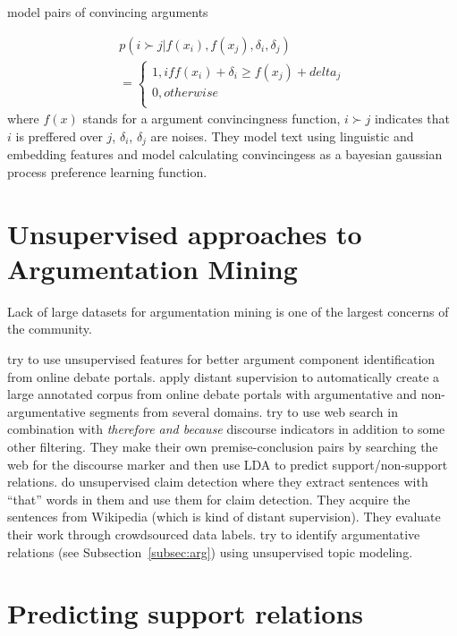 \documentclass[a4paper,10pt]{article}
\begin{document}
\cite{Simpson} model pairs of convincing arguments 

\begin{align*}
  p(i \succ j | f(x_i), f(x_j), \delta_i, \delta_j) \\ 
  = \begin{cases}
    1, if f(x_i) + \delta_i \geq f(x_j) + delta_j \\
    0, otherwise \\
    \end{cases}
\end{align*}
where $f(x)$ stands for a argument convincingness function, $i \succ j$ indicates that 
$i$ is preffered over $j$, $\delta_i$, $\delta_j$ are noises. They model text using linguistic and
embedding features and model calculating convincingess as a bayesian gaussian
process preference learning function. 


\section{Unsupervised approaches to Argumentation Mining}

Lack of large datasets for argumentation mining is one of the largest
concerns of the community. 

\cite{habernal2015exploiting} try to use unsupervised features for
better argument component identification from online debate portals. 
\cite{al2016cross} apply distant supervision to automatically create
a large annotated corpus from online debate portals with argumentative and
non-argumentative segments from several domains. 
\cite{Lawrence2017} try to use web search in combination with
\emph{therefore and because} discourse indicators in addition to some
other filtering. They make their own premise-conclusion pairs by searching
the web for the discourse marker and then use LDA to predict
support/non-support relations.
\cite{Levy2017} do unsupervised claim detection where they extract
sentences with ``that'' words in them and use 
them for claim detection. They acquire the sentences 
from Wikipedia (which is kind of distant supervision).
They evaluate their work through crowdsourced data labels. 
\cite{Ferrara2017} try to identify argumentative relations (see
Subsection~\ref{subsec:arg}) using unsupervised topic modeling. 

\section{Predicting support relations}
\end{document}
